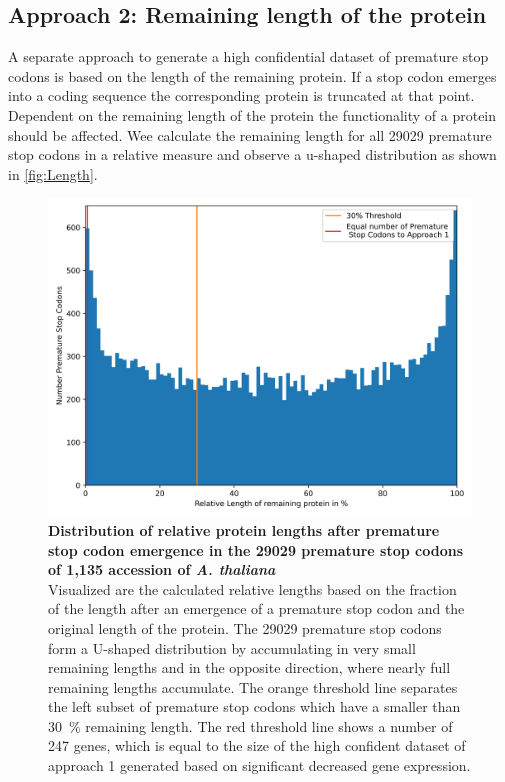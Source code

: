   \subsection{Approach 2: Remaining length of the protein}
  A separate approach to generate a high confidential dataset of premature stop codons is based on the length of the remaining protein. If a stop codon emerges into a coding sequence the corresponding protein is truncated at that point. Dependent on the remaining length of the protein the functionality of a protein should be affected. Wee calculate the remaining length for all 29029 premature stop codons in a relative measure and observe a u-shaped distribution as shown in \autoref{fig:Length}. 

  \begin{figure}[tb]
    \centering
    \begin{minipage}[h]{0.9\textwidth}
      \centering
      \includegraphics[width=1\textwidth]{images/Remaining_Length.png}
      \caption[Distribution of relative protein lengths after premature stop codon emergence.]{\textbf{Distribution of relative protein lengths after premature stop codon emergence in the 29029 premature stop codons of 1,135 accession of \textit{A. thaliana}}\\
      Visualized are the calculated relative lengths based on the fraction of the length after an emergence of a premature stop codon and the original length of the protein. The 29029 premature stop codons form a U-shaped distribution by accumulating in very small remaining lengths and in the opposite direction, where nearly full remaining lengths accumulate. The orange threshold line separates the left subset of premature stop codons which have a smaller than \SI{30}{\percent} remaining length. The red threshold line shows a number of 247 genes, which is equal to the size of the high confident dataset of approach 1 generated based on significant decreased gene expression.}
     \label{fig:Length}
    \end{minipage}
  \end{figure} 
  
